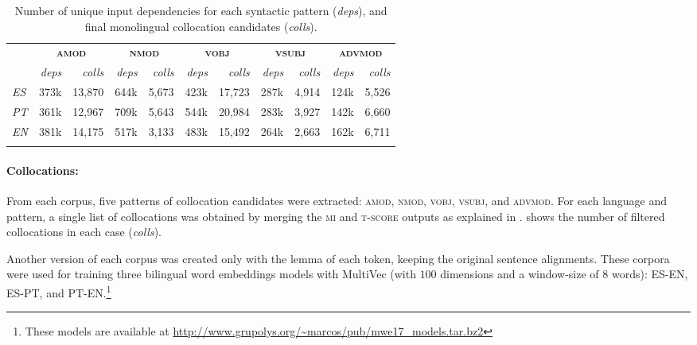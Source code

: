 \documentclass[output=paper
,modfonts
,nonflat]{langsci/langscibook}
\begin{document}
\begin{table}
  \begin{center}
    {\small{
        \caption{\label{tab:mono} Number of unique input dependencies for each syntactic pattern (\emph{deps}),
          and final monolingual collocation candidates (\emph{colls}).}
    \begin{tabular}{lrrrrrrrrrr}
      \lsptoprule
      \textbf{\multirow{2}{*}{Lg}} & \multicolumn{2}{c}{\textbf{\textsc{amod}}} & \multicolumn{2}{c}{\textbf{\textsc{nmod}}} & \multicolumn{2}{c}{\textbf{\textsc{vobj}}} & \multicolumn{2}{c}{\textbf{\textsc{vsubj}}} & \multicolumn{2}{c}{\textbf{\textsc{advmod}}} \\
      & \emph{deps} & \emph{colls} & \emph{deps} & \emph{colls} & \emph{deps} & \emph{colls} & \emph{deps} & \emph{colls} & \emph{deps} & \emph{colls}\\
      \midrule
      \emph{ES}   & 373k & 13,870   & 644k & 5,673   & 423k & 17,723 & 287k & 4,914 & 124k & 5,526 \\
      \emph{PT}   & 361k & 12,967   & 709k & 5,643   & 544k & 20,984 & 283k & 3,927 & 142k & 6,660 \\
      \emph{EN}   & 381k & 14,175   & 517k & 3,133   & 483k & 15,492 & 264k & 2,663 & 162k & 6,711 \\
      \lspbottomrule
    \end{tabular}
    }}
  \end{center}
\end{table}

\paragraph*{Collocations:} From each corpus, five patterns of collocation candidates
were extracted: \textsc{amod}, \textsc{nmod}, \textsc{vobj}, \textsc{vsubj}, and \textsc{advmod}.
For each language and pattern, a single list of collocations was obtained by merging the \textsc{mi}
and \textsc{t-score} outputs as explained in . 
shows the number of filtered collocations in each case (\emph{colls}).

Another version of each corpus was created only with the lemma of each token,
keeping the original sentence alignments. These corpora were used for training
three bilingual word embeddings models with MultiVec (with $100$ dimensions and
a window-size of $8$ words): ES-EN, ES-PT, and PT-EN.\footnote{These models
  are available at \scriptsize{\url{http://www.grupolys.org/~marcos/pub/mwe17_models.tar.bz2}}}
\end{document}
